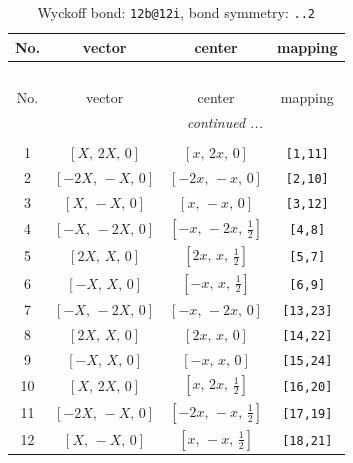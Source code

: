 \documentclass[fleqn,8pt]{jsarticle}
\begin{document}
\begin{longtable}{cccc}
\caption{Wyckoff bond: {\tt 12b@12i}, bond symmetry: {\tt ..2}}
 \\
 \hline \hline
No. & vector & center & mapping \\ \hline \endfirsthead

\multicolumn{3}{l}{\tablename\ \thetable{}} \\
 \hline \hline
No. & vector & center & mapping \\ \hline \endhead

 \hline \hline
\multicolumn{3}{r}{\footnotesize\it continued ...} \\ \endfoot

 \hline \hline
\multicolumn{3}{r}{} \\ \endlastfoot

1 & $\left[ X,\, 2 X,\, 0 \right]$ & $\left[ x,\, 2 x,\, 0 \right]$ & {\tt [1,11]} \\ \hline
2 & $\left[ - 2 X,\, - X,\, 0 \right]$ & $\left[ - 2 x,\, - x,\, 0 \right]$ & {\tt [2,10]} \\ \hline
3 & $\left[ X,\, - X,\, 0 \right]$ & $\left[ x,\, - x,\, 0 \right]$ & {\tt [3,12]} \\ \hline
4 & $\left[ - X,\, - 2 X,\, 0 \right]$ & $\left[ - x,\, - 2 x,\, \frac{1}{2} \right]$ & {\tt [4,8]} \\ \hline
5 & $\left[ 2 X,\, X,\, 0 \right]$ & $\left[ 2 x,\, x,\, \frac{1}{2} \right]$ & {\tt [5,7]} \\ \hline
6 & $\left[ - X,\, X,\, 0 \right]$ & $\left[ - x,\, x,\, \frac{1}{2} \right]$ & {\tt [6,9]} \\ \hline
7 & $\left[ - X,\, - 2 X,\, 0 \right]$ & $\left[ - x,\, - 2 x,\, 0 \right]$ & {\tt [13,23]} \\ \hline
8 & $\left[ 2 X,\, X,\, 0 \right]$ & $\left[ 2 x,\, x,\, 0 \right]$ & {\tt [14,22]} \\ \hline
9 & $\left[ - X,\, X,\, 0 \right]$ & $\left[ - x,\, x,\, 0 \right]$ & {\tt [15,24]} \\ \hline
10 & $\left[ X,\, 2 X,\, 0 \right]$ & $\left[ x,\, 2 x,\, \frac{1}{2} \right]$ & {\tt [16,20]} \\ \hline
11 & $\left[ - 2 X,\, - X,\, 0 \right]$ & $\left[ - 2 x,\, - x,\, \frac{1}{2} \right]$ & {\tt [17,19]} \\ \hline
12 & $\left[ X,\, - X,\, 0 \right]$ & $\left[ x,\, - x,\, \frac{1}{2} \right]$ & {\tt [18,21]} \\
\end{longtable}
\renewcommand{\arraystretch}{1.2}
\end{document}
